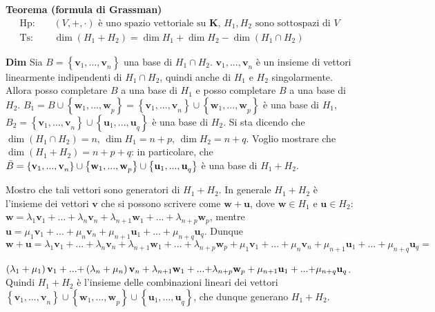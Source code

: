 \documentclass{article}
\begin{document}
\textbf{Teorema (formula di Grassman)}%
\begin{eqnarray*}
\text{Hp}\text{: } &&\left( V,+,\cdot \right) \text{ \`{e} uno spazio
vettoriale su }\mathbf{K}\text{, }H_{1},H_{2}\text{ sono sottospazi di }V \\
\text{Ts}\text{: } &&\dim \left( H_{1}+H_{2}\right) =\dim H_{1}+\dim
H_{2}-\dim \left( H_{1}\cap H_{2}\right) 
\end{eqnarray*}

\textbf{Dim} Sia $B=\left\{ \mathbf{v}_{1}\mathbf{,...,v}_{n}\right\} $ una
base di $H_{1}\cap H_{2}$. $\mathbf{v}_{1}\mathbf{,...,v}_{n}$ \`{e} un
insieme di vettori linearmente indipendenti di $H_{1}\cap H_{2}$, quindi
anche di $H_{1}$ e $H_{2}$ singolarmente. Allora posso completare $B$ a una
base di $H_{1}$ e posso completare $B$ a una base di $H_{2}$. $B_{1}=B\cup
\left\{ \mathbf{w}_{1}\mathbf{,...,w}_{p}\right\} =\left\{ \mathbf{v}_{1}%
\mathbf{,...,v}_{n}\right\} \cup \left\{ \mathbf{w}_{1}\mathbf{,...,w}%
_{p}\right\} $ \`{e} una base di $H_{1}$, $B_{2}=\left\{ \mathbf{v}_{1}%
\mathbf{,...,v}_{n}\right\} \cup \left\{ \mathbf{u}_{1}\mathbf{,...,u}%
_{q}\right\} $ \`{e} una base di $H_{2}$. Si sta dicendo che $\dim \left(
H_{1}\cap H_{2}\right) =n$, $\dim H_{1}=n+p$, $\dim H_{2}=n+q$. Voglio
mostrare che $\dim \left( H_{1}+H_{2}\right) =n+p+q$: in particolare, che $%
\bar{B}=\left\{ \mathbf{v}_{1}\mathbf{,...,v}_{n}\right\} \cup \left\{ 
\mathbf{w}_{1}\mathbf{,...,w}_{p}\right\} \cup \left\{ \mathbf{u}_{1}\mathbf{%
,...,u}_{q}\right\} $ \`{e} una base di $H_{1}+H_{2}$.

Mostro che tali vettori sono generatori di $H_{1}+H_{2}$. In generale $%
H_{1}+H_{2}$ \`{e} l'insieme dei vettori $\mathbf{v}$ che si possono
scrivere come $\mathbf{w+u}$, dove $\mathbf{w}\in H_{1}$ e $\mathbf{u}\in
H_{2}$: $\mathbf{w}=\lambda _{1}\mathbf{v}_{1}+\mathbf{...+}\lambda _{n}%
\mathbf{v}_{n}+\lambda _{n+1}\mathbf{w}_{1}+\mathbf{...+}\lambda _{n+p}%
\mathbf{w}_{p}$, mentre $\mathbf{u}=\mu _{1}\mathbf{v}_{1}+\mathbf{...+}\mu
_{n}\mathbf{v}_{n}+\mu _{n+1}\mathbf{u}_{1}+\mathbf{...+}\mu _{n+q}\mathbf{u}%
_{q}$. Dunque $\mathbf{w+u}=\lambda _{1}\mathbf{v}_{1}+\mathbf{...+}\lambda
_{n}\mathbf{v}_{n}+\lambda _{n+1}\mathbf{w}_{1}+\mathbf{...+}\lambda _{n+p}%
\mathbf{w}_{p}+\mu _{1}\mathbf{v}_{1}+\mathbf{...+}\mu _{n}\mathbf{v}%
_{n}+\mu _{n+1}\mathbf{u}_{1}+\mathbf{...+}\mu _{n+q}\mathbf{u}_{q}=$

$\left( \lambda _{1}+\mu _{1}\right) \mathbf{v}_{1}+\mathbf{...+}\left(
\lambda _{n}+\mu _{n}\right) \mathbf{v}_{n}+\lambda _{n+1}\mathbf{w}_{1}+%
\mathbf{...+}\lambda _{n+p}\mathbf{w}_{p}+\mu _{n+1}\mathbf{u}_{1}+\mathbf{%
...+}\mu _{n+q}\mathbf{u}_{q}$. Quindi $H_{1}+H_{2}$ \`{e} l'insieme delle
combinazioni lineari dei vettori $\left\{ \mathbf{v}_{1}\mathbf{,...,v}%
_{n}\right\} \cup \left\{ \mathbf{w}_{1}\mathbf{,...,w}_{p}\right\} \cup
\left\{ \mathbf{u}_{1}\mathbf{,...,u}_{q}\right\} $, che dunque generano $%
H_{1}+H_{2}$.
\end{document}

